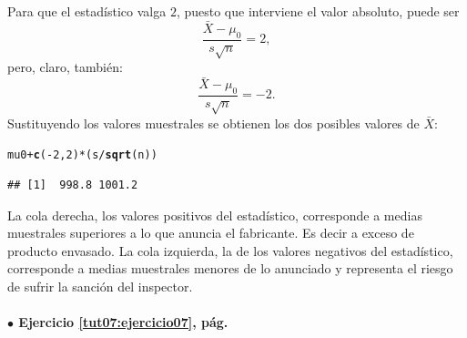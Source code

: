 \documentclass[10pt,a4paper]{article}\usepackage[]{graphicx}\usepackage[]{color}
\makeatletter
\newcommand{\hlnum}[1]{\textcolor[rgb]{0.686,0.059,0.569}{#1}}%
\newcommand{\hlopt}[1]{\textcolor[rgb]{0,0,0}{#1}}%
\newcommand{\hlstd}[1]{\textcolor[rgb]{0.345,0.345,0.345}{#1}}%
\newcommand{\hlkwd}[1]{\textcolor[rgb]{0.737,0.353,0.396}{\textbf{#1}}}%
\newenvironment{kframe}{%
 \def\at@end@of@kframe{}%
 \ifinner\ifhmode%
  \def\at@end@of@kframe{\end{minipage}}%
  \begin{minipage}{\columnwidth}%
 \fi\fi%
 \def\FrameCommand##1{\hskip\@totalleftmargin \hskip-\fboxsep
 \colorbox{shadecolor}{##1}\hskip-\fboxsep
     \hskip-\linewidth \hskip-\@totalleftmargin \hskip\columnwidth}%
 \MakeFramed {\advance\hsize-\width
   \@totalleftmargin\z@ \linewidth\hsize
   \@setminipage}}%
 {\par\unskip\endMakeFramed%
 \at@end@of@kframe}
\newenvironment{knitrout}{}{} %
\makeatother
\begin{document}
Para que el estadístico valga $2$, puesto que interviene el valor absoluto, puede ser
\[
\dfrac{\bar X - \mu_0}{s \sqrt{n}} = 2,
\]
pero, claro, también:
\[
\dfrac{\bar X - \mu_0}{s \sqrt{n}} = -2.
\]
Sustituyendo los valores muestrales se obtienen los dos posibles valores de $\bar X$:

\begin{knitrout}
\color{fgcolor}\begin{kframe}
\begin{alltt}
\hlstd{mu0} \hlopt{+} \hlkwd{c}\hlstd{(}\hlopt{-}\hlnum{2}\hlstd{,} \hlnum{2}\hlstd{)} \hlopt{*} \hlstd{(s}\hlopt{/}\hlkwd{sqrt}\hlstd{(n))}
\end{alltt}
\begin{verbatim}
## [1]  998.8 1001.2
\end{verbatim}
\end{kframe}
\end{knitrout}

La cola derecha, los valores positivos del estadístico, corresponde a medias muestrales superiores a lo que anuncia el fabricante. Es decir a exceso de producto envasado. La cola izquierda, la de los valores negativos del estadístico, corresponde a medias muestrales menores de lo anunciado y representa el riesgo de sufrir la sanción del inspector.


\paragraph{\bf $\bullet$ Ejercicio \ref{tut07:ejercicio07}, pág. \pageref{tut07:ejercicio07}}
\label{tut07:ejercicio07:sol}\quad\\
\end{document}
